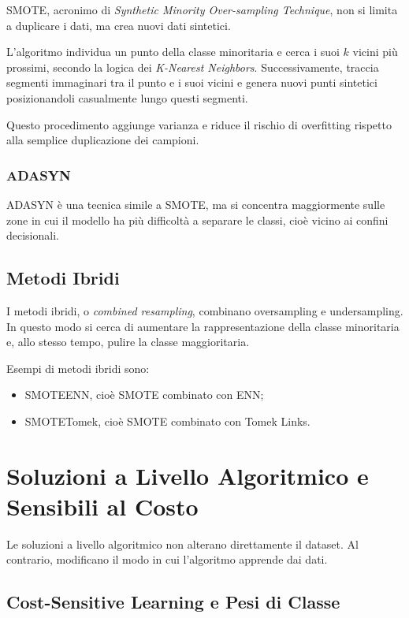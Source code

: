 \documentclass[11pt, a4paper]{article}
\begin{document}
SMOTE, acronimo di \emph{Synthetic Minority Over-sampling Technique}, non si
limita a duplicare i dati, ma crea nuovi dati sintetici.

L'algoritmo individua un punto della classe minoritaria e cerca i suoi $k$ vicini
più prossimi, secondo la logica dei \emph{K-Nearest Neighbors}. Successivamente,
traccia segmenti immaginari tra il punto e i suoi vicini e genera nuovi punti
sintetici posizionandoli casualmente lungo questi segmenti.

Questo procedimento aggiunge varianza e riduce il rischio di overfitting rispetto
alla semplice duplicazione dei campioni.

\subsubsection{ADASYN}

ADASYN è una tecnica simile a SMOTE, ma si concentra maggiormente sulle zone in
cui il modello ha più difficoltà a separare le classi, cioè vicino ai confini
decisionali.

\subsection{Metodi Ibridi}

I metodi ibridi, o \emph{combined resampling}, combinano oversampling e
undersampling. In questo modo si cerca di aumentare la rappresentazione della
classe minoritaria e, allo stesso tempo, pulire la classe maggioritaria.

Esempi di metodi ibridi sono:

\begin{itemize}
    \item SMOTEENN, cioè SMOTE combinato con ENN;
    \item SMOTETomek, cioè SMOTE combinato con Tomek Links.
\end{itemize}

\section{Soluzioni a Livello Algoritmico e Sensibili al Costo}

Le soluzioni a livello algoritmico non alterano direttamente il dataset. Al
contrario, modificano il modo in cui l'algoritmo apprende dai dati.

\subsection{Cost-Sensitive Learning e Pesi di Classe}
\end{document}
